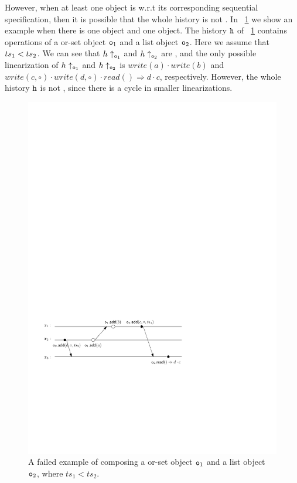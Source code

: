 However, %
when at least one object is \tonelinearizable{} w.r.t its corresponding sequential specification, then it is possible that the whole history is not \crdtlinearizable. In \figurename~\ref{fig:a failed example of composing a multi-value register with a last-write-win register} we show an example when there is one \tonelinearizable{} object and one \tzerolinearizable{} object. The history $\mathtt{h}$ of \figurename~\ref{fig:a failed example of composing a multi-value register with a last-write-win register} contains operations of a or-set object $\mathtt{o}_1$ and a list object $\mathtt{o}_2$. Here we assume that $ts_1 < ts_2$. We can see that $h \uparrow_{\mathtt{o}_1}$ and $h \uparrow_{\mathtt{o}_2}$ are \crdtlinearizable, and the only possible linearization of $h \uparrow_{\mathtt{o}_1}$ and $h \uparrow_{\mathtt{o}_2}$ is $\mathit{write}(a) \cdot \mathit{write}(b)$ and $\mathit{write}(c,\circ) \cdot \mathit{write}(d,\circ) \cdot \mathit{read}() \Rightarrow d \cdot c$, respectively. However, the whole history $\mathtt{h}$ is not \crdtlinearizable, since there is a cycle in smaller linearizations.

\begin{figure}[t]
  \centering
  \includegraphics[width=0.6 \textwidth]{figures/MVReg-LWWReg-Nocd.pdf}
\vspace{-10pt}
  \caption{A failed example of composing a \tzerolinearizable or-set object $\mathtt{o}_1$ and a \tonelinearizable list object $\mathtt{o}_2$, where $\mathit{ts}_1 < \mathit{ts}_2$.}
  \label{fig:a failed example of composing a multi-value register with a last-write-win register}
\end{figure}

